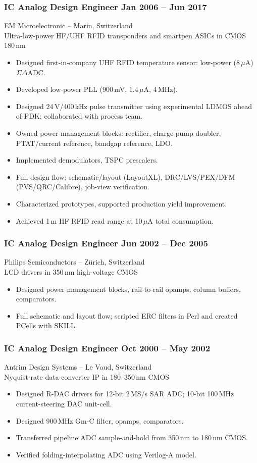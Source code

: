 \documentclass[11pt,a4paper]{article}
\begin{document}
	\subsubsection*{IC Analog Design Engineer \hfill Jan 2006 -- Jun 2017}
	EM Microelectronic -- Marin, Switzerland \\
	Ultra-low-power HF/UHF RFID transponders and smartpen ASICs in CMOS\,180\,nm
	\begin{itemize}
		\item Designed first-in-company UHF RFID temperature sensor: low-power (8\,$\mu$A) ${\Sigma}{\Delta}$ADC.
		\item Developed low-power PLL (900\,mV, 1.4\,$\mu$A, 4\,MHz).
		\item Designed 24\,V/400\,kHz pulse transmitter using experimental LDMOS ahead of PDK; collaborated with process team.
		\item Owned power-management blocks: rectifier, charge-pump doubler, PTAT/current reference, bandgap reference, LDO.
		\item Implemented demodulators, TSPC prescalers.
		\item Full design flow: schematic/layout (LayoutXL), DRC/LVS/PEX/DFM (PVS/QRC/Calibre), job-view verification.
		\item Characterized prototypes, supported production yield improvement.
		\item Achieved 1\,m HF RFID read range at 10\,$\mu$A total consumption.
	\end{itemize}
	
	\subsubsection*{IC Analog Design Engineer \hfill Jun 2002 -- Dec 2005}
	Philips Semiconductors -- Zürich, Switzerland \\
	LCD drivers in 350\,nm high-voltage CMOS
	\begin{itemize}
		\item Designed power-management blocks, rail-to-rail opamps, column buffers, comparators.
		\item Full schematic and layout flow; scripted ERC filters in Perl and created PCells with SKILL.
	\end{itemize}
	
	\subsubsection*{IC Analog Design Engineer \hfill Oct 2000 -- May 2002}
	Antrim Design Systems -- Le Vaud, Switzerland \\
	Nyquist-rate data-converter IP in 180--350\,nm CMOS
	\begin{itemize}
		\item Designed R-DAC drivers for 12-bit 2\,MS/s SAR ADC; 10-bit 100\,MHz current-steering DAC unit-cell.
		\item Designed 900\,MHz Gm-C filter, opamps, comparators.
		\item Transferred pipeline ADC sample-and-hold from 350\,nm to 180\,nm CMOS.
		\item Verified folding-interpolating ADC using Verilog-A model.
	\end{itemize}
	
\end{document}
